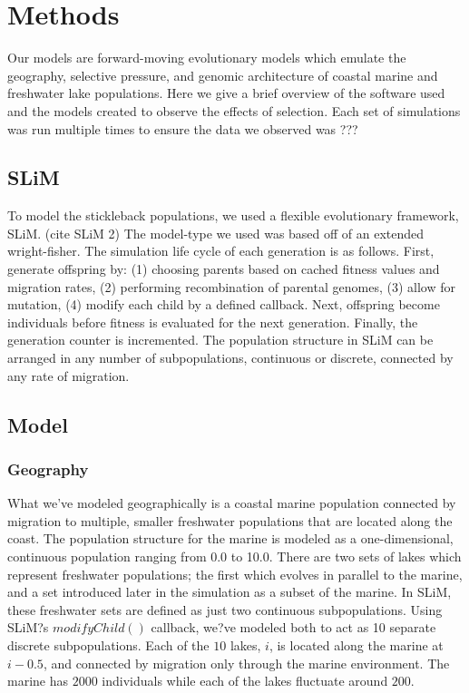 \documentclass{article}
\begin{document}
\section{Methods}

Our models are forward-moving evolutionary models which
emulate the geography, selective pressure, and genomic architecture 
of coastal marine and freshwater lake populations. 
Here we give a brief overview of the software used and the models created to observe the effects of selection. 
Each set of simulations was run multiple times to ensure the data we observed was ???


\subsection{SLiM}

To model the stickleback populations, we used a flexible evolutionary framework, SLiM. (cite SLiM 2) 
The model-type we used was based off of an extended wright-fisher. 
The simulation life cycle of each generation is as follows.
First, 
generate offspring by:
(1) choosing parents based on cached fitness values and migration rates, 
(2) performing recombination of parental genomes, 
(3) allow for mutation, 
(4) modify each child by a defined callback. 
Next, 
offspring become individuals before fitness is evaluated for the next generation.
Finally,
the generation counter is incremented. 
The population structure in SLiM can be arranged in any number of subpopulations, 
continuous or discrete, connected by any rate of migration. 


\subsection{Model}

\subsubsection{Geography}



What we've modeled geographically is a coastal marine population 
connected by migration to multiple, smaller freshwater populations that are located along the coast.
The population structure for the marine is modeled as a one-dimensional, continuous population
ranging from 0.0 to 10.0.
There are two sets of lakes which represent freshwater populations; 
the first which evolves in parallel to the marine, 
and a set introduced later in the simulation as a subset of the marine. 
In SLiM, these freshwater sets are defined as just two continuous subpopulations. 
Using SLiM?s $modifyChild()$ callback, we?ve modeled both to act as 10 separate discrete subpopulations. 
Each of the $10$ lakes, $i$, is located along the marine at $i - 0.5$, 
and connected by migration only through the marine environment. 
The marine has $2000$ individuals while 
each of the lakes fluctuate around $200$. 
\end{document}
